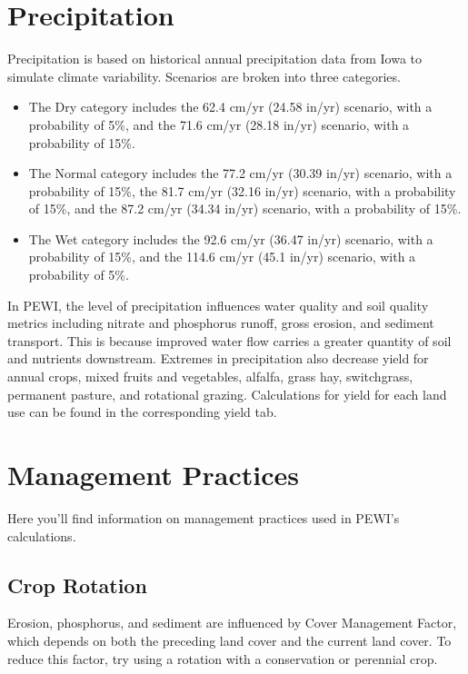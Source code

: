 \documentclass[11pt]{article}
\begin{document}
\section{Precipitation}
Precipitation is based on historical annual precipitation data from Iowa to simulate climate variability. Scenarios are broken into three categories. 
\begin{itemize}
  \item The Dry category includes the 62.4 cm/yr (24.58 in/yr) scenario, with a probability of 5\%, and the 71.6 cm/yr (28.18 in/yr) scenario, with a probability of 15\%. 
  \item The Normal category includes the 77.2 cm/yr (30.39 in/yr) scenario, with a probability of 15\%, the 81.7 cm/yr (32.16 in/yr) scenario, with a probability of 15\%, and the 87.2 cm/yr (34.34 in/yr) scenario, with a probability of 15\%.
  \item The Wet category includes the 92.6 cm/yr (36.47 in/yr) scenario, with a probability of 15\%, and the 114.6 cm/yr (45.1 in/yr) scenario, with a probability of 5\%.
\end{itemize}

In PEWI, the level of precipitation influences water quality and soil quality metrics including nitrate and phosphorus runoff, gross erosion, and sediment transport. This is because improved water flow carries a greater quantity of soil and nutrients downstream. Extremes in precipitation also decrease yield for annual crops, mixed fruits and vegetables, alfalfa, grass hay, switchgrass, permanent pasture, and rotational grazing.\cite{33}  Calculations for yield for each land use can be found in the corresponding yield tab.


\newpage
\section{Management Practices}
Here you’ll find information on management practices used in PEWI’s calculations.

\subsection{Crop Rotation}
Erosion, phosphorus, and sediment are influenced by Cover Management Factor, which depends on both the preceding land cover and the current land cover. To reduce this factor, try using a rotation with a conservation or perennial crop.

\newpage
\end{document}
